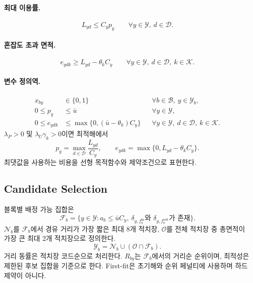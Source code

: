 \documentclass[a4paper,11pt]{article}
\begin{document}
\paragraph{최대 이용률.}
\begin{equation}
L_{yd}\le C_yp_y\qquad\forall y\in\mathcal Y,\ d\in\mathcal D.
\end{equation}
\paragraph{혼잡도 초과 면적.}
\begin{equation}
e_{ydk}\ge L_{yd}-\theta_kC_y
\qquad\forall y\in\mathcal Y,\ d\in\mathcal D,\ k\in\mathcal K.
\end{equation}
\paragraph{변수 정의역.}
\begin{align}
x_{by}&\in\{0,1\}&&\forall b\in\mathcal B,\ y\in\mathcal Y_b,\\
0\le p_y&\le\bar u&&\forall y\in\mathcal Y,\\
0\le e_{ydk}&\le\max\{0,(\bar u-\theta_k)C_y\}
&&\forall y\in\mathcal Y,\ d\in\mathcal D,\ k\in\mathcal K.
\end{align}
$\lambda_P>0$ 및 $\lambda_U\gamma_k>0$이면 최적해에서
\begin{equation}
p_y=\max_{d\in\mathcal D}\frac{L_{yd}}{C_y},\qquad
e_{ydk}=\max\{0,L_{yd}-\theta_kC_y\}.
\end{equation}
최댓값을 사용하는 비용을 선형 목적함수와 제약조건으로 표현한다.

\subsection{Candidate Selection}
블록별 배정 가능 집합은
\begin{equation}
\mathcal F_b=\{y\in\mathcal Y:a_b\le\bar uC_y,\ 
\delta_{y,f_b^{\mathrm{in}}}\text{와 }\delta_{y,f_b^{\mathrm{out}}}\text{가 존재}\}.
\end{equation}
$\mathcal N_b$를 $\mathcal F_b$에서 경유 거리가 가장 짧은 최대 8개 적치장,
$\mathcal O$를 전체 적치장 중 총면적이 가장 큰 최대 2개 적치장으로 정의한다.
\begin{equation}
\mathcal Y_b=\mathcal N_b\cup(\mathcal O\cap\mathcal F_b).
\end{equation}
거리 동률은 적치장 코드순으로 처리한다.
$R_{by}$는 $\mathcal F_b$에서의 거리순 순위이며, 최적성은 제한된 후보 집합을 기준으로 한다.
First-fit은 초기해와 순위 페널티에 사용하며 하드 제약이 아니다.
\end{document}
